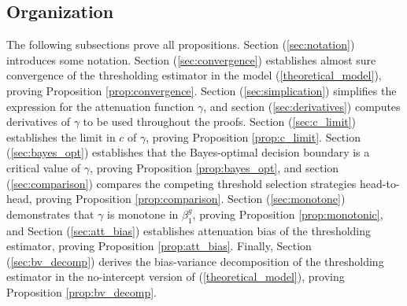 \documentclass[11pt]{article}
\begin{document}
\begin{appendices}
\begin{refsection}
\subsection{Organization} The following subsections prove all propositions. Section (\ref{sec:notation}) introduces some notation. Section (\ref{sec:convergence}) establishes almost sure convergence of the thresholding estimator in the model (\ref{theoretical_model}), proving Proposition \ref{prop:convergence}. Section (\ref{sec:simplication}) simplifies the expression for the attenuation function $\gamma$, and section (\ref{sec:derivatives})  computes derivatives of $\gamma$ to be used throughout the proofs. Section (\ref{sec:c_limit}) establishes the limit in $c$ of $\gamma$, proving Proposition \ref{prop:c_limit}. Section (\ref{sec:bayes_opt}) establishes that the Bayes-optimal decision boundary is a critical value of $\gamma$, proving Proposition \ref{prop:bayes_opt}, and section (\ref{sec:comparison}) compares the competing threshold selection strategies head-to-head, proving Proposition \ref{prop:comparison}. Section (\ref{sec:monotone}) demonstrates that $\gamma$ is monotone in $\beta^g_1$, proving Proposition \ref{prop:monotonic}, and Section (\ref{sec:att_bias}) establishes attenuation bias of the thresholding estimator, proving Proposition \ref{prop:att_bias}. Finally, Section (\ref{sec:bv_decomp}) derives the bias-variance decomposition of the thresholding estimator in the no-intercept version of (\ref{theoretical_model}), proving Proposition \ref{prop:bv_decomp}.



\end{refsection}
\end{appendices}
\end{document}

